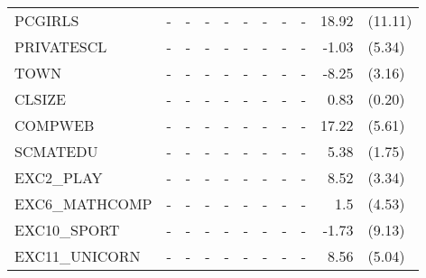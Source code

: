 \documentclass[10pt]{article}
\begin{document}
\begin{table}[htbp]
\begin{tabular}{lrlrlrlrlrl}
      PCGIRLS & \multicolumn{1}{c}{-} & \multicolumn{1}{c}{-} & \multicolumn{1}{c}{-} & \multicolumn{1}{c}{-} & \multicolumn{1}{c}{-} & \multicolumn{1}{c}{-} & \multicolumn{1}{c}{-} & \multicolumn{1}{c}{-} & 18.92 & (11.11) \\[0.2em]
      PRIVATESCL & \multicolumn{1}{c}{-} & \multicolumn{1}{c}{-} & \multicolumn{1}{c}{-} & \multicolumn{1}{c}{-} & \multicolumn{1}{c}{-} & \multicolumn{1}{c}{-} & \multicolumn{1}{c}{-} & \multicolumn{1}{c}{-} & -1.03 & (5.34) \\[0.2em]
      TOWN  & \multicolumn{1}{c}{-} & \multicolumn{1}{c}{-} & \multicolumn{1}{c}{-} & \multicolumn{1}{c}{-} & \multicolumn{1}{c}{-} & \multicolumn{1}{c}{-} & \multicolumn{1}{c}{-} & \multicolumn{1}{c}{-} & -8.25 & (3.16) \\[0.2em]
      CLSIZE & \multicolumn{1}{c}{-} & \multicolumn{1}{c}{-} & \multicolumn{1}{c}{-} & \multicolumn{1}{c}{-} & \multicolumn{1}{c}{-} & \multicolumn{1}{c}{-} & \multicolumn{1}{c}{-} & \multicolumn{1}{c}{-} & 0.83  & (0.20) \\[0.2em]
      COMPWEB & \multicolumn{1}{c}{-} & \multicolumn{1}{c}{-} & \multicolumn{1}{c}{-} & \multicolumn{1}{c}{-} & \multicolumn{1}{c}{-} & \multicolumn{1}{c}{-} & \multicolumn{1}{c}{-} & \multicolumn{1}{c}{-} & 17.22 & (5.61) \\[0.2em]
      SCMATEDU & \multicolumn{1}{c}{-} & \multicolumn{1}{c}{-} & \multicolumn{1}{c}{-} & \multicolumn{1}{c}{-} & \multicolumn{1}{c}{-} & \multicolumn{1}{c}{-} & \multicolumn{1}{c}{-} & \multicolumn{1}{c}{-} & 5.38  & (1.75) \\[0.2em]
      EXC2\_PLAY & \multicolumn{1}{c}{-} & \multicolumn{1}{c}{-} & \multicolumn{1}{c}{-} & \multicolumn{1}{c}{-} & \multicolumn{1}{c}{-} & \multicolumn{1}{c}{-} & \multicolumn{1}{c}{-} & \multicolumn{1}{c}{-} & 8.52  & (3.34) \\[0.2em]
      EXC6\_MATHCOMP & \multicolumn{1}{c}{-} & \multicolumn{1}{c}{-} & \multicolumn{1}{c}{-} & \multicolumn{1}{c}{-} & \multicolumn{1}{c}{-} & \multicolumn{1}{c}{-} & \multicolumn{1}{c}{-} & \multicolumn{1}{c}{-} & 1.5   & (4.53) \\[0.2em]
      EXC10\_SPORT & \multicolumn{1}{c}{-} & \multicolumn{1}{c}{-} & \multicolumn{1}{c}{-} & \multicolumn{1}{c}{-} & \multicolumn{1}{c}{-} & \multicolumn{1}{c}{-} & \multicolumn{1}{c}{-} & \multicolumn{1}{c}{-} & -1.73 & (9.13) \\[0.2em]
      EXC11\_UNICORN & \multicolumn{1}{c}{-} & \multicolumn{1}{c}{-} & \multicolumn{1}{c}{-} & \multicolumn{1}{c}{-} & \multicolumn{1}{c}{-} & \multicolumn{1}{c}{-} & \multicolumn{1}{c}{-} & \multicolumn{1}{c}{-} & 8.56  & (5.04) \\[0.2em]

\end{tabular}
\end{table}
\end{document}
